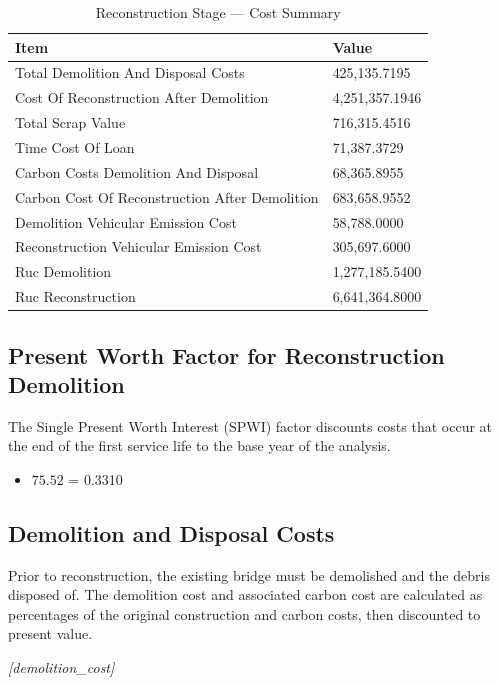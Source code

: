 \documentclass[12pt,a4paper]{article}
\begin{document}
\begin{table}[H]
\centering
\caption{Reconstruction Stage --- Cost Summary}
\begin{tabular}{L{9cm}R{5cm}}
\toprule
\textbf{Item} & \textbf{Value} \\
\midrule
  Total Demolition And Disposal Costs & 425,135.7195 \\
  Cost Of Reconstruction After Demolition & 4,251,357.1946 \\
  Total Scrap Value & 716,315.4516 \\
  Time Cost Of Loan & 71,387.3729 \\
  Carbon Costs Demolition And Disposal & 68,365.8955 \\
  Carbon Cost Of Reconstruction After Demolition & 683,658.9552 \\
  Demolition Vehicular Emission Cost & 58,788.0000 \\
  Reconstruction Vehicular Emission Cost & 305,697.6000 \\
  Ruc Demolition & 1,277,185.5400 \\
  Ruc Reconstruction & 6,641,364.8000 \\
\bottomrule
\end{tabular}
\end{table}


\subsection{Present Worth Factor for Reconstruction Demolition}

The Single Present Worth Interest (SPWI) factor discounts costs that occur at the end of the first service life to the base year of the analysis.


\begin{itemize}
  \item $75.52$ = 0.3310
\end{itemize}

\subsection{Demolition and Disposal Costs}

Prior to reconstruction, the existing bridge must be demolished and the debris disposed of. The demolition cost and associated carbon cost are calculated as percentages of the original construction and carbon costs, then discounted to present value.


\textit{[demolition\_cost]}
\end{document}
